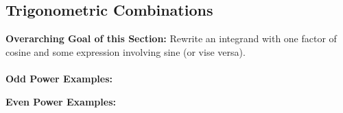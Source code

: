 \subsection*{Trigonometric Combinations}
\textbf{Overarching Goal of this Section:} Rewrite an integrand with one factor of cosine and some expression involving sine (or vise versa).\\
\\
\textbf{Odd Power Examples:}


\textbf{Even Power Examples:}


\newpage

